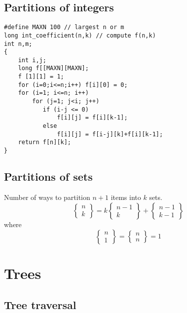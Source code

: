 \documentclass[a4paper]{article}
\begin{document}
\subsection{Partitions of integers}

\begin{verbatim}
#define MAXN 100 // largest n or m
long int_coefficient(n,k) // compute f(n,k)
int n,m;
{
    int i,j;
    long f[[MAXN][MAXN];
    f [1][1] = 1;
    for (i=0;i<=n;i++) f[i][0] = 0;
    for (i=1; i<=n; i++)
        for (j=1; j<i; j++)
           if (i-j <= 0)
               f[i][j] = f[i][k-1];
           else
               f[i][j] = f[i-j][k]+f[i][k-1];
    return f[n][k];
}
\end{verbatim}

\subsection{Partitions of sets}

Number of ways to partition $n+1$ items into $k$ sets.
\begin{equation}
\left\{\begin{matrix}n \\ k\end{matrix}\right\}=k\left\{\begin{matrix}
n-1 \\ k
\end{matrix}\right\}+\left\{\begin{matrix}
n-1 \\ k-1
\end{matrix}\right\}
\end{equation}
where
\begin{equation}
\left\{\begin{matrix}
n \\ 1
\end{matrix}\right\}=\left\{\begin{matrix}
n \\ n
\end{matrix}\right\}=1
\end{equation}

\section{Trees}

\subsection{Tree traversal}
\end{document}
